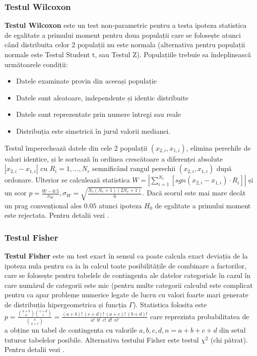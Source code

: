 \documentclass[12pt]{article}
\begin{document}
\subsubsection{Testul Wilcoxon}
 \textbf{Testul Wilcoxon} este un test non-parametric pentru a testa ipoteza statistica de egalitate a primului moment pentru doua populații care se folosește atunci când distribuita celor 2 populații nu este normala (alternativa pentru populații normale este Testul Student t, sau Testul Z). 
 Populațiile trebuie sa îndeplinească următoarele condiții:
 \begin{itemize}
  \item Datele examinate provin din aceeași populație
  \item Datele sunt aleatoare, independente și identic distribuite
  \item Datele sunt reprezentate prin numere întregi sau reale
  \item Distribuția este simetrică în jurul valorii medianei.
 \end{itemize}
  Testul împerechează datele din cele 2 populații $(x_{2,i},x_{1,i})$, elimina perechile de valori identice, și le sortează în ordinea crescătoare a diferenței absolute $|x_{2,i}-x_{1,i}|$ cu $R_i=1, ..., N_r$ semnificând rangul perechii $(x_{2,i},x_{1,i})$ după ordonare. 
  Ulterior se calculează statistica $W = |\sum_{i=1}^{N_r} [sgn(x_{2,i} - x_{1,i}) \cdot R_i]| $ și un scor $p = \frac{W - 0.5}{\sigma_W}, \sigma_W = \sqrt{\frac{N_r(N_r + 1)(2N_r + 1)}{6}}$. 
  Dacă scorul este mai mare decât un prag convențional ales $0.05$ atunci ipoteza $H_0$ de egalitate a primului moment este rejectata. 
  Pentru detalii vezi \citep{wilcoxon45,siegel56}.

\subsubsection{Testul Fisher}
 \label{testFisher}
 \textbf{Testul Fisher} este un test exact în sensul ca poate calcula exact deviația de la ipoteza nula pentru ca ia în calcul toate posibilitățile de combinare a factorilor, care se folosește pentru tabelele de contingenta ale datelor categoriale în cazul în care numărul de categorii este mic (pentru multe categorii calculul este complicat pentru ca apar probleme numerice legate de lucru cu valori foarte mari generate de distribuția hipergeometrica și funcția $\Gamma$). Statistica folosita este $p = \frac{ \displaystyle{{a+b}\choose{a}} \displaystyle{{c+d}\choose{c}} }{ \displaystyle{{n}\choose{a+c}} } = \frac{(a+b)!~(c+d)!~(a+c)!~(b+d)!}{a!~~b!~~c!~~d!~~n!}$ care reprezinta probabilitatea de a obține un tabel de contingenta cu valorile $a, b, c, d, n=a+b+c+d$ din setul tuturor tabelelor posibile. Alternativa testului Fisher este testul $\chi^2$ (chi pătrat). Pentru detalii vezi \citep{fisher1922interpretation}.
\end{document}
